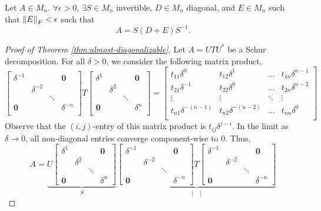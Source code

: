 \begin{theorem}
\label{thm:almost-diagonalizable}
Let $A \in M_n$. $\forall \epsilon > 0$, $\exists S \in M_n$ invertible, $D \in M_n$ diagonal, and $E \in M_n$ such that $\left\lVert E\right\rVert_F < \epsilon$ such that
$$
A = S(D+E)S^{-1}.
$$
\end{theorem}

\begin{proof}[Proof of Theorem \ref{thm:almost-diagonalizable}]
Let $A = UTU^*$ be a Schur decomposition. For all $\delta > 0$, we consider the following matrix product,
$$
\begin{bmatrix}
\delta^{-1} & & & \mathbf{0} \\
& \delta^{-2} & & \\
& & \ddots & \\
\mathbf{0} & & & \delta^{-n} \\
\end{bmatrix}
T
\begin{bmatrix}
\delta^{1} & & & \mathbf{0} \\
& \delta^{2} & & \\
& & \ddots & \\
\mathbf{0} & & & \delta^{n} \\
\end{bmatrix}
=
\begin{bmatrix}
t_{11}\delta^0 & t_{12}\delta^1 & \dots & t_{1n}\delta^{n-1} \\
t_{21}\delta^{-1} & t_{22}\delta^0 & \dots & t_{2n}\delta^{n-2} \\
\vdots & \vdots & \ddots & \vdots \\
t_{n1}\delta^{-(n-1)} & t_{n2}\delta^{-(n-2)} & \dots & t_{nn}\delta^0 \\
\end{bmatrix}
$$
Observe that the $(i,j)$-entry of this matrix product is $t_{ij}\delta^{j-i}$. In the limit as $\delta \rightarrow 0$, all non-diagonal entries converge component-wise to 0. Thus,
$$
A = \underbrace{U \begin{bmatrix} \delta^1 & & & \mathbf{0} \\ & \delta^2 & & \\ & & \ddots & \\ \mathbf{0} & & & \delta^n \end{bmatrix}}_{S} \underbrace{\begin{bmatrix} \delta^{-1} & & & \mathbf{0} \\ & \delta^{-2} & & \\ & & \ddots & \\ \mathbf{0} & & & \delta^{-n} \end{bmatrix} T \begin{bmatrix} \delta^{-1} & & & \mathbf{0} \\ & \delta^{-2} & & \\ & & \ddots & \\ \mathbf{0} & & & \delta^{-n} \end{bmatrix}}_{\begin{bmatrix}

\end{bmatrix}}$$
\end{proof}
